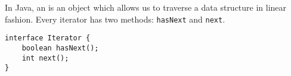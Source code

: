 In Java, an  is an object which allows us to traverse a data structure in linear fashion. Every iterator has two methods: \texttt{hasNext} and \texttt{next}.

\begin{lstlisting}
interface Iterator {
    boolean hasNext();
    int next();
}
\end{lstlisting}

